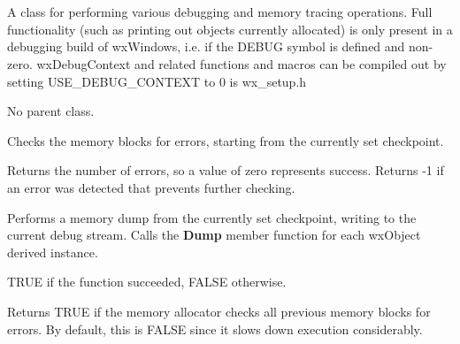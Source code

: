 \section{}\label{wxdebugcontext}

A class for performing various debugging and memory tracing
operations. Full functionality (such as printing out objects
currently allocated) is only present in a debugging build of wxWindows,
i.e. if the DEBUG symbol is defined and non-zero. wxDebugContext
and related functions and macros can be compiled out by setting
USE\_DEBUG\_CONTEXT to 0 is wx\_setup.h


No parent class.




\label{wxdebugcontextcheck}


Checks the memory blocks for errors, starting from the currently set
checkpoint.


Returns the number of errors,
so a value of zero represents success. Returns -1 if an error
was detected that prevents further checking.

\label{wxdebugcontextdump}


Performs a memory dump from the currently set checkpoint, writing to the
current debug stream. Calls the {\bf Dump} member function for each wxObject
derived instance.


TRUE if the function succeeded, FALSE otherwise.

\label{wxdebugcontextgetcheckprevious}


Returns TRUE if the memory allocator checks all previous memory blocks for errors.
By default, this is FALSE since it slows down execution considerably.



